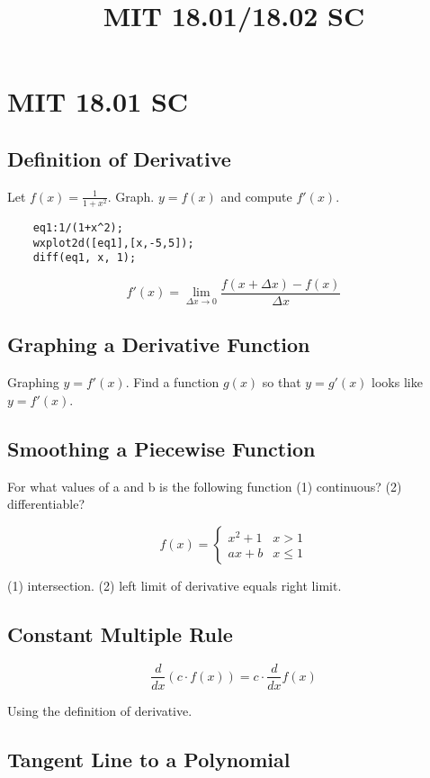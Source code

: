 \title{MIT 18.01/18.02 SC}

\section{MIT 18.01 SC}

\subsection{Definition of Derivative}

Let $f(x) = \frac{1}{1+x^2}$. Graph. $y=f(x)$ and compute $f'(x)$.

\begin{verbatim}
	eq1:1/(1+x^2);
	wxplot2d([eq1],[x,-5,5]);
	diff(eq1, x, 1);
\end{verbatim}

$$ f'(x) = \lim_{\Delta x\rightarrow 0} \frac{f(x+\Delta x)-f(x)}{\Delta x} $$

\subsection{Graphing a Derivative Function}

Graphing $y=f'(x)$. Find a function $g(x)$ so that $y=g'(x)$ looks like $y=f'(x)$.

\subsection{Smoothing a Piecewise Function}

For what values of a and b is the following function (1) continuous?
(2) differentiable?

$$ f(x) = \left\{ \begin{array}{ll} x^2+1 & x>1 \\ ax+b & x \leq 1 \end{array} \right.$$

(1) intersection. (2) left limit of derivative equals right limit.

\subsection{Constant Multiple Rule}

$$ \frac{d}{dx}(c\cdot f(x)) = c\cdot \frac{d}{dx}f(x) $$

Using the definition of derivative.

\subsection{Tangent Line to a Polynomial}

